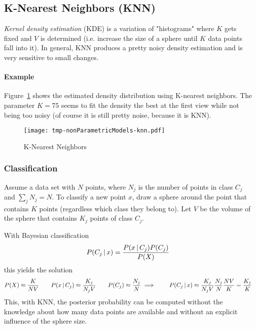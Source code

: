 		\subsection{K-Nearest Neighbors (KNN)}
			\emph{Kernel density estimation} (KDE) is a variation of "histograms" where \(K\) gets fixed and \(V\) is determined (i.e. increase the size of a sphere until \(K\) data points fall into it). In general, KNN produces a pretty noisy density estimation and is very sensitive to small changes.

			\paragraph{Example}
				Figure~\ref{fig:knn} shows the estimated density distribution using K-nearest neighbors. The parameter \( K = 75 \) seems to fit the density the best at the first view while not being too noisy (of course it is still pretty noise, because it is KNN).

				\begin{figure}
					\centering
					\texttt{[image: tmp-nonParametricModels-knn.pdf]}
					\caption{K-Nearest Neighbors}
					\label{fig:knn}
				\end{figure}

			\subsubsection{Classification}
				Assume a data set with \(N\) points, where \(N_j\) is the number of points in class \(C_j\) and \( \sum_j N_j = N \). To classify a new point \(x\), draw a sphere around the point that contains \(K\) points (regardless which class they belong to). Let \(V\) be the volume of the sphere that contains \(K_j\) points of class \(C_j\).

				With Bayesian classification
				\begin{equation}
					P(C_j \,\vert\, x) = \frac{P(x \,\vert\, C_j) P(C_j)}{P(X)}
				\end{equation}
				this yields the solution
				\begin{equation}
					P(X) \approx \frac{K}{NV} \qquad P(x \,\vert\, C_j) \approx \frac{K_j}{N_jV} \qquad P(C_j) \approx \frac{N_j}{N} \\
					\implies\qquad P(C_j \,\vert\, x) \approx \frac{K_j}{N_jV} \frac{N_j}{N} \frac{NV}{K} = \frac{K_j}{K}
				\end{equation}
				This, with KNN, the posterior probability can be computed without the knowledge about how many data points are available and without an explicit influence of the sphere size.

